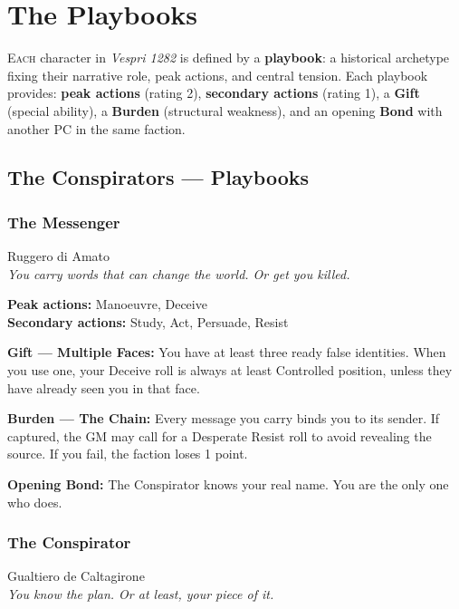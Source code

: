 
\chapter{The Playbooks}

\lettrine[lines=3]{E}{ach} character in \textit{Vespri 1282} is defined
by a \textbf{playbook}: a historical archetype fixing their narrative
role, peak actions, and central tension. Each playbook provides:
\textbf{peak actions} (rating 2), \textbf{secondary actions} (rating 1),
a \textbf{Gift} (special ability), a \textbf{Burden} (structural
weakness), and an opening \textbf{Bond} with another PC in the same
faction.

\secsep

\section{The Conspirators — Playbooks}

\subsection{The Messenger}
{\cinzel\footnotesize\color{grigionote} Ruggero di Amato}\\
\textit{You carry words that can change the world. Or get you killed.}

\textbf{Peak actions:} Manoeuvre, Deceive\\
\textbf{Secondary actions:} Study, Act, Persuade, Resist

\textbf{Gift --- Multiple Faces:} You have at least three ready false
identities. When you use one, your Deceive roll is always at least
Controlled position, unless they have already seen you in that face.

\textbf{Burden --- The Chain:} Every message you carry binds you to
its sender. If captured, the GM may call for a Desperate Resist roll
to avoid revealing the source. If you fail, the faction loses 1 point.

\textbf{Opening Bond:} The Conspirator knows your real name.
You are the only one who does.

\filetto

\subsection{The Conspirator}
{\cinzel\footnotesize\color{grigionote} Gualtiero de Caltagirone}\\
\textit{You know the plan. Or at least, your piece of it.}

